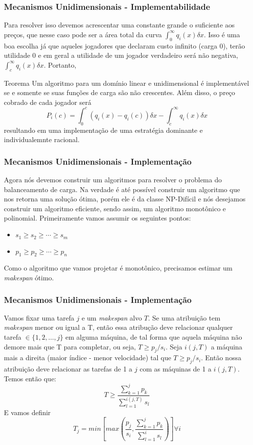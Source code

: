 \documentclass{beamer}
\begin{document}
\begin{frame}
    \frametitle{Mecanismos Unidimensionais - Implementabilidade}
    Para resolver isso devemos acrescentar uma constante grande o suficiente aos preços, que nesse caso pode ser a área total da curva $\int_{0}^{\infty} q_i(x) \delta x$. Isso é uma boa escolha já que aqueles jogadores que declaram custo infinito (carga 0), terão utilidade 0 e em geral a utilidade de um jogador verdadeiro será não negativa, $\int_{c}^{\infty} q_i(x) \delta x$. Portanto, %
    \begin{block}{Teorema}
        Um algoritmo para um domínio linear e unidimensional é implementável se e somente se suas funções de carga são não crescentes. Além disso, o preço cobrado de cada jogador será
        $$
        P_i(c) = \int_{0}^{c} \left(q_i(x) - q_i(c) \right) \delta x - \int_{c}^{\infty} q_i(x) \delta x
        $$
        resultando em uma implementação de uma estratégia dominante e individualemnte racional.
    \end{block}
\end{frame}

\begin{frame}
    \frametitle{Mecanismos Unidimensionais - Implementação}
    Agora nós devemos construir um algoritmos para resolver o problema do balanceamento de carga. Na verdade é até possível construir um algoritmo que nos retorna uma solução ótima, porém ele é da classe NP-Difícil e nós desejamos construir um algoritmo eficiente, sendo assim, um algoritmo monotônico e polinomial. Primeiramente vamos assumir os seguintes pontos:
    \begin{itemize}
        \item{$s_1 \geq s_2 \geq \cdots \geq s_m$}
        \item{$p_1 \geq p_2 \geq \cdots \geq p_n$}
    \end{itemize}
    Como o algoritmo que vamos projetar é monotônico, precisamos estimar um \textit{makespan} ótimo.
\end{frame}

\begin{frame}
    \frametitle{Mecanismos Unidimensionais - Implementação}
    Vamos fixar uma tarefa $j$ e um \textit{makespan} alvo $T$. Se uma atribuição tem \textit{makespan} menor ou igual a T, então essa atribução deve relacionar qualquer tarefa $\in \{1, 2, \ldots, j\}$ em alguma máquina, de tal forma que aquela máquina não demore mais que T para completar, ou seja, $T \geq p_j/s_i$. Seja $i(j, T)$ a máquina mais a direita (maior índice - menor velocidade) tal que $T \geq p_j/s_i$. Então nossa atribuição deve relacionar as tarefas de 1 a $j$ com as máquinas de 1 a $i(j, T)$. Temos então que:
    $$
        T \geq \frac{\sum_{k = 1}^{j} p_k}{\sum_{l = 1}^{i(j, T)} s_l}
    $$
    E vamos definir
    $$
        T_j = min \left[ max\left( \frac{p_j}{s_i}, \frac{\sum_{k = 1}^{j} p_k}{\sum_{l = 1}^{i} s_l} \right) \right] \forall i
    $$
\end{frame}
\end{document}
